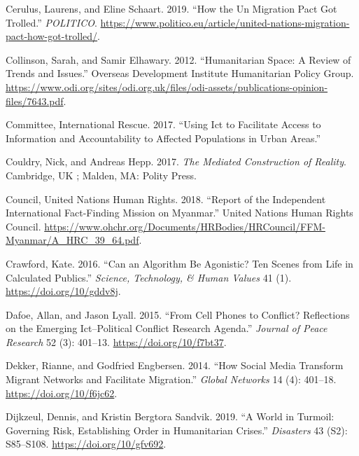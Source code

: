 \begin{cslreferences}
\leavevmode\hypertarget{ref-Cerulus2019How}{}%
Cerulus, Laurens, and Eline Schaart. 2019. ``How the Un Migration Pact
Got Trolled.'' \emph{POLITICO}.
\url{https://www.politico.eu/article/united-nations-migration-pact-how-got-trolled/}.

\leavevmode\hypertarget{ref-Collinson2012Humanitarian}{}%
Collinson, Sarah, and Samir Elhawary. 2012. ``Humanitarian Space: A
Review of Trends and Issues.'' Overseas Development Institute
Humanitarian Policy Group.
\url{https://www.odi.org/sites/odi.org.uk/files/odi-assets/publications-opinion-files/7643.pdf}.

\leavevmode\hypertarget{ref-InternationalRescueCommittee2017Using}{}%
Committee, International Rescue. 2017. ``Using Ict to Facilitate Access
to Information and Accountability to Affected Populations in Urban
Areas.''

\leavevmode\hypertarget{ref-Couldry2017mediated}{}%
Couldry, Nick, and Andreas Hepp. 2017. \emph{The Mediated Construction
of Reality}. Cambridge, UK ; Malden, MA: Polity Press.

\leavevmode\hypertarget{ref-UnitedNationsHumanRightsCouncil2018Report}{}%
Council, United Nations Human Rights. 2018. ``Report of the Independent
International Fact-Finding Mission on Myanmar.'' United Nations Human
Rights Council.
\url{https://www.ohchr.org/Documents/HRBodies/HRCouncil/FFM-Myanmar/A_HRC_39_64.pdf}.

\leavevmode\hypertarget{ref-Crawford2016Can}{}%
Crawford, Kate. 2016. ``Can an Algorithm Be Agonistic? Ten Scenes from
Life in Calculated Publics.'' \emph{Science, Technology, \& Human
Values} 41 (1). \url{https://doi.org/10/gddv8j}.

\leavevmode\hypertarget{ref-Dafoe2015From}{}%
Dafoe, Allan, and Jason Lyall. 2015. ``From Cell Phones to Conflict?
Reflections on the Emerging Ict--Political Conflict Research Agenda.''
\emph{Journal of Peace Research} 52 (3): 401--13.
\url{https://doi.org/10/f7bt37}.

\leavevmode\hypertarget{ref-Dekker2014How}{}%
Dekker, Rianne, and Godfried Engbersen. 2014. ``How Social Media
Transform Migrant Networks and Facilitate Migration.'' \emph{Global
Networks} 14 (4): 401--18. \url{https://doi.org/10/f6jc62}.

\leavevmode\hypertarget{ref-Dijkzeul2019world}{}%
Dijkzeul, Dennis, and Kristin Bergtora Sandvik. 2019. ``A World in
Turmoil: Governing Risk, Establishing Order in Humanitarian Crises.''
\emph{Disasters} 43 (S2): S85--S108. \url{https://doi.org/10/gfv692}.


\end{cslreferences}
